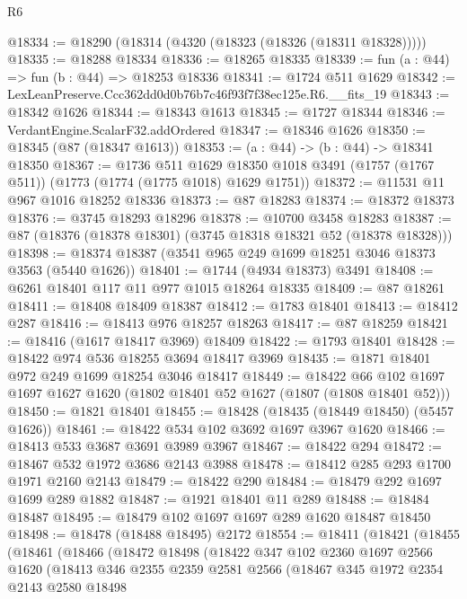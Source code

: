 \begin{lexlean}{R6}
\begin{coremodule}
@18334 := @18290 (@18314 (@4320 (@18323 (@18326 (@18311 @18328)))))
@18335 := @18288 @18334
@18336 := @18265 @18335
@18339 := fun (a : @44) => fun (b : @44) => @18253 @18336
@18341 := @1724 @511 @1629
@18342 := LexLeanPreserve.Ccc362dd0d0b76b7c46f93f7f38ec125e.R6.__fits_19
@18343 := @18342 @1626
@18344 := @18343 @1613
@18345 := @1727 @18344
@18346 := VerdantEngine.ScalarF32.addOrdered
@18347 := @18346 @1626
@18350 := @18345 (@87 (@18347 @1613))
@18353 := (a : @44) -> (b : @44) -> @18341 @18350
@18367 := @1736
    @511
    @1629
    @18350
    @1018
    @3491
    (@1757 (@1767 @511))
    (@1773 (@1774 (@1775 @1018) @1629 @1751))
@18372 := @11531 @11 @967 @1016 @18252 @18336
@18373 := @87 @18283
@18374 := @18372 @18373
@18376 := @3745 @18293 @18296
@18378 := @10700 @3458 @18283
@18387 := @87 (@18376 (@18378 @18301) (@3745 @18318 @18321 @52 (@18378 @18328)))
@18398 := @18374 @18387 (@3541 @965 @249 @1699 @18251 @3046 @18373 @3563 (@5440 @1626))
@18401 := @1744 (@4934 @18373) @3491
@18408 := @6261 @18401 @117 @11 @977 @1015 @18264 @18335
@18409 := @87 @18261
@18411 := @18408 @18409 @18387
@18412 := @1783 @18401
@18413 := @18412 @287
@18416 := @18413 @976 @18257 @18263
@18417 := @87 @18259
@18421 := @18416 (@1617 @18417 @3969) @18409
@18422 := @1793 @18401
@18428 := @18422 @974 @536 @18255 @3694 @18417 @3969
@18435 := @1871 @18401 @972 @249 @1699 @18254 @3046 @18417
@18449 := @18422
    @66
    @102
    @1697
    @1697
    @1627
    @1620
    (@1802 @18401 @52 @1627 (@1807 (@1808 @18401 @52)))
@18450 := @1821 @18401
@18455 := @18428 (@18435 (@18449 @18450) (@5457 @1626))
@18461 := @18422 @534 @102 @3692 @1697 @3967 @1620
@18466 := @18413 @533 @3687 @3691 @3989 @3967
@18467 := @18422 @294
@18472 := @18467 @532 @1972 @3686 @2143 @3988
@18478 := @18412 @285 @293 @1700 @1971 @2160 @2143
@18479 := @18422 @290
@18484 := @18479 @292 @1697 @1699 @289 @1882
@18487 := @1921 @18401 @11 @289
@18488 := @18484 @18487
@18495 := @18479 @102 @1697 @1697 @289 @1620 @18487 @18450
@18498 := @18478 (@18488 @18495) @2172
@18554 := @18411
    (@18421
      (@18455
        (@18461
          (@18466
            (@18472
              @18498
              (@18422
                @347
                @102
                @2360
                @1697
                @2566
                @1620
                (@18413
                  @346
                  @2355
                  @2359
                  @2581
                  @2566
                  (@18467
                    @345
                    @1972
                    @2354
                    @2143
                    @2580
                    @18498

\end{coremodule}
\end{lexlean}
